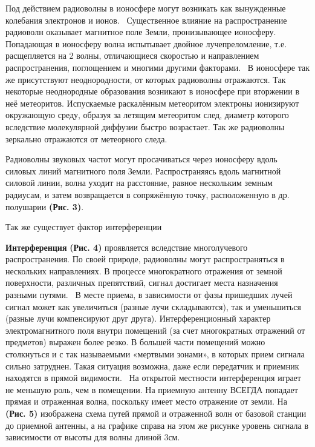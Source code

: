 \documentclass[a4paper,12pt]{article} %
\begin{document}
Под действием радиоволны в ионосфере могут возникать как вынужденные колебания электронов и ионов. \
Существенное влияние на распространение радиоволн оказывает магнитное поле Земли, пронизывающее ионосферу. Попадающая в ионосферу волна испытывает двойное лучепреломление, т.е. расщепляется на 2 волны, отличающиеся скоростью и направлением распространения, поглощением и многими другими факторами. \
В ионосфере так же присутствуют неоднородности, от которых радиоволны отражаются. Так некоторые неоднородные образования возникают в ионосфере при вторжении в неё метеоритов. Испускаемые раскалённым метеоритом электроны ионизируют окружающую среду, образуя за летящим метеоритом след, диаметр которого вследствие молекулярной диффузии быстро возрастает. Так же радиоволны зеркально отражаются от метеорного следа. \

Радиоволны звуковых частот могут просачиваться через ионосферу вдоль силовых линий магнитного поля Земли. Распространяясь вдоль магнитной силовой линии, волна уходит на расстояние, равное нескольким земным радиусам, и затем возвращается в сопряжённую точку, расположенную в др. полушарии  \textbf{(Рис. 3)}. \

Так же существует фактор интерференции \

\textbf{Интерференция} \textbf{(Рис. 4)} проявляется вследствие многолучевого распространения. По своей природе, радиоволны могут распространяться в нескольких направлениях. В процессе многократного отражения от земной поверхности, различных препятствий, сигнал достигает места назначения разными путями. \
В месте приема, в зависимости от фазы пришедших лучей сигнал может как увеличиться (разные лучи складываются), так и уменьшиться (разные лучи компенсируют друг друга). Интерференционный характер электромагнитного поля внутри помещений (за счет многократных отражений от предметов) выражен более резко. В большей части помещений можно столкнуться и с так называемыми «мертвыми зонами», в которых прием сигнала сильно затруднен. Такая ситуация возможна, даже если передатчик и приемник находятся в прямой видимости. \
На открытой местности интерференция играет не меньшую роль, чем в помещении. На приемную антенну ВСЕГДА попадает прямая и отраженная волна, поскольку имеет место отражение от земли. На \textbf{(Рис. 5)} изображена схема путей прямой и отраженной волн от базовой станции до приемной антенны, а на графике справа на этом же рисунке уровень сигнала в зависимости от высоты для волны длиной 3см.

\newpage
\end{document}
